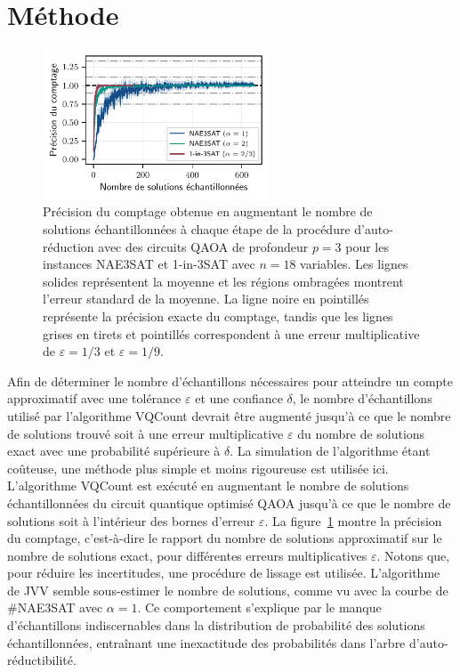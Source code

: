 \section{Méthode}
\label{sec:methode}
\begin{figure}[ht!]
    \centering
    \includegraphics[width=0.6\textwidth]{figures/count-accuracy.pdf}
    \caption[Précision du comptage pour des problèmes \textsf{\#P}-difficile]{Précision du comptage obtenue en augmentant le nombre de solutions échantillonnées à chaque étape de la procédure d'auto-réduction avec des circuits QAOA de profondeur $p=3$ pour les instances NAE3SAT et 1-in-3SAT avec $n=18$ variables. Les lignes solides représentent la moyenne et les régions ombragées montrent l'erreur standard de la moyenne. La ligne noire en pointillés représente la précision exacte du comptage, tandis que les lignes grises en tirets et pointillés correspondent à une erreur multiplicative de $\varepsilon = 1/3$ et $\varepsilon = 1/9$.}
    \label{fig:count-accuracy.pdf}
\end{figure}

Afin de déterminer le nombre d'échantillons nécessaires pour atteindre un compte approximatif avec une tolérance $\varepsilon$ et une confiance $\delta$, le nombre d'échantillons utilisé par l'algorithme VQCount devrait être augmenté jusqu'à ce que le nombre de solutions trouvé soit à une erreur multiplicative $\varepsilon$ du nombre de solutions exact avec une probabilité supérieure à $\delta$. La simulation de l'algorithme étant coûteuse, une méthode plus simple et moins rigoureuse est utilisée ici. L'algorithme VQCount est exécuté en augmentant le nombre de solutions échantillonnées du circuit quantique optimisé QAOA jusqu'à ce que le nombre de solutions soit à l'intérieur des bornes d'erreur $\varepsilon$. La figure~\ref{fig:count-accuracy.pdf} montre la précision du comptage, c'est-à-dire le rapport du nombre de solutions approximatif sur le nombre de solutions exact, pour différentes erreurs multiplicatives $\varepsilon$. Notons que, pour réduire les incertitudes, une procédure de lissage est utilisée. L'algorithme de JVV semble sous-estimer le nombre de solutions, comme vu avec la courbe de \#NAE3SAT avec $\alpha = 1$. Ce comportement s'explique par le manque d'échantillons indiscernables dans la distribution de probabilité des solutions échantillonnées, entraînant une inexactitude des probabilités dans l'arbre d'auto-réductibilité.

